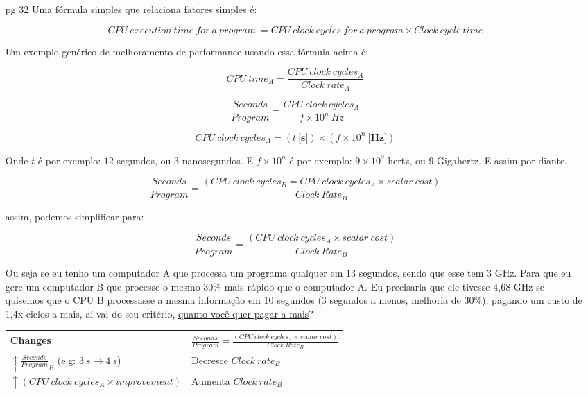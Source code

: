 \documentclass{article}
\begin{document}
\begin{enumerate}
\item[pg 32] Uma fórmula simples que relaciona fatores simples é:

$$CPU\ execution\ time\ for\ a\ program\ = CPU\ clock\ cycles\ for\ a\ program 
\times Clock\ cycle\ time$$

Um exemplo genérico de melhoramento de performance usando essa fórmula acima é:

$$CPU\ time_{A} = \frac{CPU\ clock\ cycles_{A}}{Clock\ rate_{A}}$$

$$\frac{Seconds}{Program} = \frac{CPU\ clock\ cycles_{A}}{f \times 10^{n}\ 
Hz}$$

$$CPU\ clock\ cycles_{A} = (t\ \textbf{[s]}) \times (f \times 
10^{n}\ \textbf{[Hz]})$$

Onde $t$ é por exemplo: $12$ segundos, ou 3 nanosegundos. E $f \times
10^{n}$ é por exemplo: $9\times10^{9}$ hertz, ou 9 Gigahertz. E assim por
diante.

$$\frac{Seconds}{Program} = \frac{(CPU\ clock\ cycles_{B} = CPU\ clock\ 
cycles_{A} \times scalar\ cost)}{Clock\ Rate_{B}}$$

assim, podemos simplificar para:

$$\frac{Seconds}{Program} = \frac{(CPU\ clock\ cycles_{A} \times 
scalar\ cost)}{Clock\ Rate_{B}}$$

Ou seja se eu tenho um computador A que processa um programa qualquer em $13$ 
segundos, sendo que esse tem $3$ GHz. Para que eu gere um computador B que 
processe o mesmo $30\%$ mais rápido que o computador A. Eu precisaria que ele 
tivesse 4,68 GHz se quisemos que o CPU B processasse a mesma informação em 10 
segundos (3 segundos a menos, melhoria de $30\%$), pagando um custo de 1,4x 
ciclos a mais, aí vai do seu critério, \underline{quanto você quer pagar a 
mais}?

\begin{table}[ht!]
  \centering
  \begin{tabular}{|l|l|}
  \hline Changes & $\frac{Seconds}{Program} = \frac{(CPU\ clock\ cycles_{A} 
  \times scalar\ cost)}{Clock\ Rate_{B}}$ \\ 
  \hline $\uparrow {\frac{Seconds}{Program}}_{B}$ (e.g: $3\ s\rightarrow 
  4\ s$) & Decresce $Clock\ rate_{B}$ \\ 
  \hline $\uparrow (CPU\ clock\ cycles_{A} \times 
  improvement)$ & Aumenta $Clock\ rate_{B}$ \\ 
  \hline 
  \end{tabular}
\end{table}


\end{enumerate}
\end{document}
